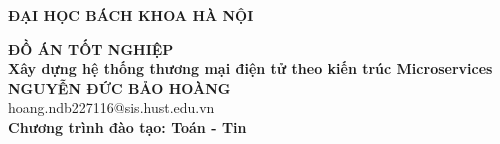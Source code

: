 \documentclass[DoAn.tex]{subfiles}
\begin{document}
\begin{titlepage}
\thispagestyle{empty}
\begin{center}

\textbf{\large{ĐẠI HỌC BÁCH KHOA HÀ NỘI}}\vspace{2.5cm}

\textbf{\huge{ ĐỒ ÁN TỐT NGHIỆP}}\\[1cm]
\textbf{\Large{Xây dựng hệ thống thương mại điện tử theo kiến trúc Microservices}}\\[1cm]

\textbf{\large{NGUYỄN ĐỨC BẢO HOÀNG}}\\
\large{hoang.ndb227116@sis.hust.edu.vn}\\[0.5cm]

\textbf{\large{Chương trình đào tạo: Toán - Tin}}\\[0.5cm]

\vfill
\begin{table}[H]
\centering
{}
\end{table}
\end{center}

\end{titlepage}
\end{document}
